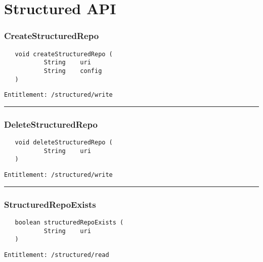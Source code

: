 \chapter{Structured API}

\subsection{CreateStructuredRepo}
\label{Api:CreateStructuredRepo}
\begin{Verbatim}
   void createStructuredRepo (
           String    uri
           String    config
   )
\end{Verbatim}
\begin{Verbatim}[formatcom=\color{Maroon}]
  Entitlement: /structured/write
\end{Verbatim}



\rule{12cm}{2pt}
\subsection{DeleteStructuredRepo}
\label{Api:DeleteStructuredRepo}
\begin{Verbatim}
   void deleteStructuredRepo (
           String    uri
   )
\end{Verbatim}
\begin{Verbatim}[formatcom=\color{Maroon}]
  Entitlement: /structured/write
\end{Verbatim}



\rule{12cm}{2pt}
\subsection{StructuredRepoExists}
\label{Api:StructuredRepoExists}
\begin{Verbatim}
   boolean structuredRepoExists (
           String    uri
   )
\end{Verbatim}
\begin{Verbatim}[formatcom=\color{Maroon}]
  Entitlement: /structured/read
\end{Verbatim}



